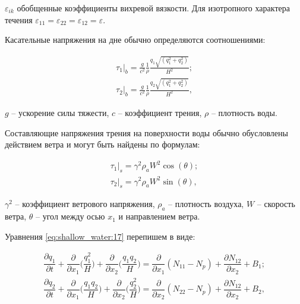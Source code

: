 \documentclass[14pt]{extreport}
\begin{document}
 $\varepsilon_{ik}$ обобщенные коэффициенты вихревой вязкости. Для изотропного характера течения $\varepsilon_{11}=\varepsilon_{22}=\varepsilon_{12}=\varepsilon.$

Касательные напряжения на дне обычно определяются соотношениями:

\begin{equation}\label{eq:shallow_water:20}
\begin{aligned}
\tau_1\bigg|_b = \frac{g}{c^2} \frac{1}{\rho} \frac{q_1\sqrt{(q_1^2+q_2^2)}}{H^2}; \\
\tau_2\bigg|_b = \frac{g}{c^2} \frac{1}{\rho} \frac{q_2\sqrt{(q_1^2+q_2^2)}}{H^2},
\end{aligned}
\end{equation}

 $g$ -- ускорение силы тяжести, $c$ -- коэффициент трения, $\rho$ -- плотность воды. 

Составляющие напряжения трения на поверхности воды обычно обусловлены действием ветра и могут быть найдены по формулам:

\begin{equation}\label{eq:shallow_water:21}
\begin{aligned}
\tau_1\bigg|_s=\gamma^2\rho_aW^2\cos(\theta);\\
\tau_2\bigg|_s=\gamma^2\rho_aW^2\sin(\theta),
\end{aligned}
\end{equation}

 $\gamma^2$ -- коэффициент ветрового напряжения, $\rho_a$ -- плотность воздуха, $W$ -- скорость ветра, $\theta$ -- угол между осью $x_1$ и направлением ветра.

Уравнения \eqref{eq:shallow_water:17} перепишем в виде:


\begin{equation}\label{eq:shallow_water:22}
\begin{aligned}
\dfrac{\partial q_1}{\partial t} + \dfrac{\partial}{\partial x_1} \bigg(\dfrac{q_1^2}{H}\bigg)+\dfrac{\partial }{\partial x_2}\bigg(\dfrac{q_1 q_2}{H}\bigg) = \dfrac{\partial}{\partial x_1} (N_{11}-N_p) + \dfrac{\partial N_{12}}{\partial x_2} + B_1; \\
\dfrac{\partial q_2}{\partial t} + \dfrac{\partial}{\partial x_1} \bigg(\dfrac{q_1 q_2}{H}\bigg)+\dfrac{\partial }{\partial x_2}\bigg(\dfrac{q_2^2}{H}\bigg) = \dfrac{\partial}{\partial x_2} (N_{22}-N_p) + \dfrac{\partial N_{12}}{\partial x_2} + B_2,
\end{aligned}
\end{equation}
\end{document}
